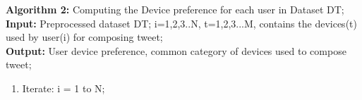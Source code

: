 \documentclass[conference]{IEEEtran}
\begin{document}
\textbf{Algorithm 2:} Computing the Device preference for each user in Dataset DT; \\
\textbf{Input:} Preprocessed dataset DT; i=1,2,3..N, t=1,2,3...M, contains the devices(t) used by user(i) for composing tweet;\\
\textbf{Output:} User device preference, common category of devices used to compose tweet; \\

\begin{enumerate}
	\item Iterate: i = 1 to N; \\
	
\end{enumerate}

 
\end{document}
